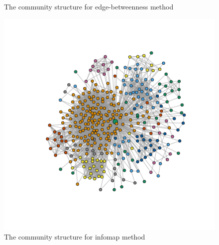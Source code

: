 \documentclass{article}
\begin{document}
\begin{figure}[htbp]
{\begin{minipage}[b]{0.4\textwidth}
\caption*{The community structure for edge-betweenness method}
\includegraphics[width=1\textwidth]{3_6.png}
\caption*{The community structure for infomap method}
\end{minipage}
}
\end{figure}
\end{document}
